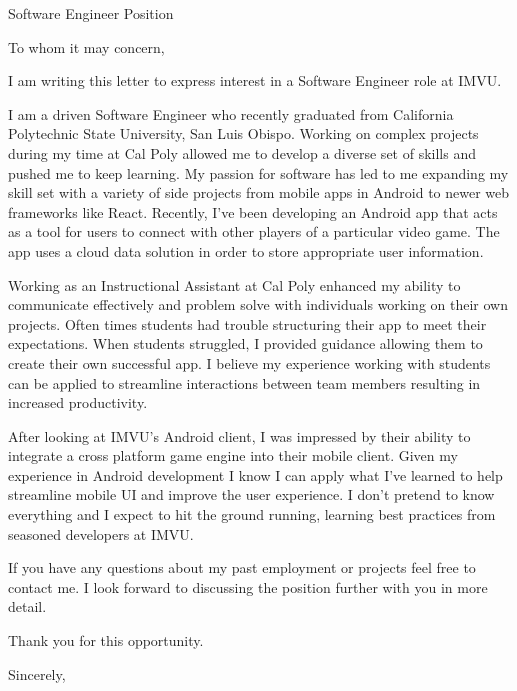 \documentclass[]{letter}
\makeatletter
\newcommand{\role}{Software Engineer }
\newcommand{\company}{IMVU}
\newcommand{\roleAt}{\role role at \company}
\newcommand{\university}{California Polytechnic State University, San Luis Obispo}
\newcommand{\email}{griffinpjohnson@gmail.com}
\newcommand{\phoneNum}{(425) 417 - 5098 }
\newcommand{\myname}{Griffin Johnson}
\makeatother
\begin{document}

\begin{letter}
{
	\role Position
}

\address
{
	\myname \\
	1200 Oceanaire Dr Apt B \\
	San Luis Obispo, CA 93405 \\
	\email \\
	\phoneNum
}

\newcommand{\imvu}
{
	After looking at IMVU's Android client, I was impressed by their ability to integrate a cross platform game engine into their mobile client. Given my experience in Android development I know I can apply what I've learned to help streamline mobile UI and improve the user experience. I don't pretend to know everything and I expect to hit the ground running, learning best practices from seasoned developers at IMVU.
}

\opening{To whom it may concern,}

I am writing this letter to express interest in a \roleAt.

I am a driven Software Engineer who recently graduated from \university. Working on complex projects during my time at Cal Poly allowed me to develop a diverse set of skills and pushed me to keep learning. My passion for software has led to me expanding my skill set with a variety of side projects from mobile apps in Android to newer web frameworks like React. Recently, I've been developing an Android app that acts as a tool for users to connect with other players of a particular video game. The app uses a cloud data solution in order to store appropriate user information.


Working as an Instructional Assistant at Cal Poly enhanced my ability to communicate effectively and problem solve with individuals working on their own projects. Often times students had trouble structuring their app to meet their expectations. When students struggled, I provided guidance allowing them to create their own successful app. I believe my experience working with students can be applied to streamline interactions between team members resulting in increased productivity. 

\imvu

If you have any questions about my past employment or projects feel free to contact me. I look forward to discussing the position further with you in more detail.  

Thank you for this opportunity.

\signature
{ 
	\myname
}


\closing
{
	Sincerely,
}


\end{letter}
\end{document}
